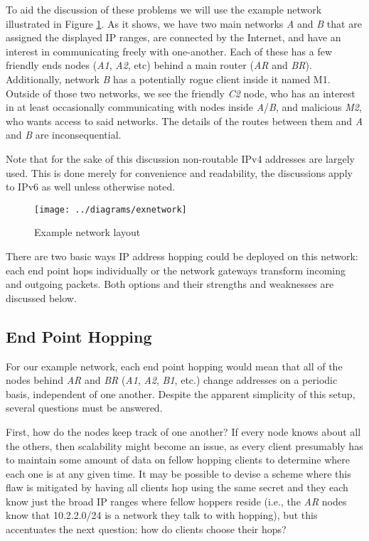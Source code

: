 \par To aid the discussion of these problems we will use the example network illustrated in Figure \ref{fig:exnetwork}. As it shows, we have two main networks \textit{A} and \textit{B} that are assigned the displayed IP ranges, are connected by the Internet, and have an interest in communicating freely with one-another. Each of these has a few friendly ends nodes (\textit{A1}, \textit{A2}, etc) behind a main router (\textit{AR} and \textit{BR}). Additionally, network \textit{B} has a potentially rogue client inside it named M1. Outside of those two networks, we see the friendly \textit{C2} node, who has an interest in at least occasionally communicating with nodes inside \textit{A}/\textit{B}, and malicious \textit{M2}, who wants access to said networks. The details of the routes between them and \textit{A} and \textit{B} are inconsequential.

\par Note that for the sake of this discussion non-routable IPv4 addresses are largely used. This is done merely for convenience and readability, the discussions apply to IPv6 as well unless otherwise noted.

\begin{figure}
	\centering
	\texttt{[image: ../diagrams/exnetwork]}
	\caption{Example network layout}
	\label{fig:exnetwork}
\end{figure}

\par There are two basic ways IP address hopping could be deployed on this network: each end point hops individually or the network gateways transform incoming and outgoing packets. Both options and their strengths and weaknesses are discussed below.

\subsection{End Point Hopping}
\par For our example network, each end point hopping would mean that all of the nodes behind \textit{AR} and \textit{BR} (\textit{A1}, \textit{A2}, \textit{B1}, etc.) change addresses on a periodic basis, independent of one another. Despite the apparent simplicity of this setup, several questions must be answered.

\par First, how do the nodes keep track of one another? If every node knows about all the others, then scalability might become an issue, as every client presumably has to maintain some amount of data on fellow hopping clients to determine where each one is at any given time. It may be possible to devise a scheme where this flaw is mitigated by having all clients hop using the same secret and they each know just the broad IP ranges where fellow hoppers reside (i.e., the \textit{AR} nodes know that 10.2.2.0/24 is a network they talk to with hopping), but this accentuates the next question: how do clients choose their hops?

